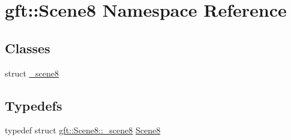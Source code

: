 \hypertarget{namespacegft_1_1Scene8}{\section{gft\-:\-:Scene8 Namespace Reference}
\label{namespacegft_1_1Scene8}
}
\subsection*{Classes}
\begin{DoxyCompactItemize}
\item 
struct \hyperlink{structgft_1_1Scene8_1_1__scene8}{\-\_\-scene8}
\end{DoxyCompactItemize}
\subsection*{Typedefs}
\begin{DoxyCompactItemize}
\item 
typedef struct \hyperlink{structgft_1_1Scene8_1_1__scene8}{gft\-::\-Scene8\-::\-\_\-scene8} \hyperlink{namespacegft_1_1Scene8_a78f9a172f8a505f9577adac7f85bc009}{Scene8}
\end{DoxyCompactItemize}
